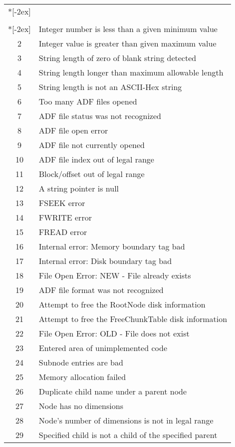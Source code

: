 \begin{longtable}{c >{\raggedright\arraybackslash}p{\Pwidth}}
\\*[-2ex]\hline
\multicolumn{2}{r}{\emph{Continued on next page}} \\
\endfoot
\\*[-2ex] \hline\hline
\endlastfoot
1   & Integer number is less than a given minimum value \\
2   & Integer value is greater than given maximum value \\
3   & String length of zero of blank string detected \\
4   & String length longer than maximum allowable length \\
5   & String length is not an ASCII-Hex string \\
6   & Too many ADF files opened \\
7   & ADF file status was not recognized \\
8   & ADF file open error \\
9   & ADF file not currently opened \\
10  & ADF file index out of legal range \\
11  & Block/offset out of legal range \\
12  & A string pointer is null \\
13  & FSEEK error \\
14  & FWRITE error \\
15  & FREAD error \\
16  & Internal error: Memory boundary tag bad \\
17  & Internal error: Disk boundary tag bad \\
18  & File Open Error: NEW - File already exists \\
19  & ADF file format was not recognized \\
20  & Attempt to free the RootNode disk information \\
21  & Attempt to free the FreeChunkTable disk information \\
22  & File Open Error: OLD - File does not exist \\
23  & Entered area of unimplemented code \\
24  & Subnode entries are bad \\
25  & Memory allocation failed \\
26  & Duplicate child name under a parent node \\
27  & Node has no dimensions \\
28  & Node's number of dimensions is not in legal range \\
29  & Specified child is not a child of the specified parent \\

\end{longtable}
